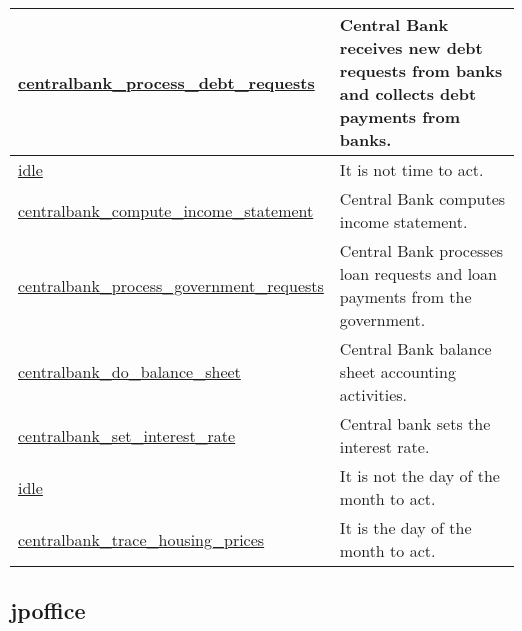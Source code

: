 \documentclass[a4paper,11pt]{article}
\begin{document}
\begin{longtable}[H!]{ll}
\midrule
\parbox{5cm}{\url{centralbank_process_debt_requests}}  & \parbox{10cm}{Central Bank receives new debt requests from banks and collects debt payments from banks.} \\
\midrule
\parbox{5cm}{\url{idle}}  & \parbox{10cm}{It is not time to act.} \\
\midrule
\parbox{5cm}{\url{centralbank_compute_income_statement}}  & \parbox{10cm}{Central Bank computes income statement.} \\
\midrule
\parbox{5cm}{\url{centralbank_process_government_requests}}  & \parbox{10cm}{Central Bank processes loan requests and loan payments from the government.} \\
\midrule
\parbox{5cm}{\url{centralbank_do_balance_sheet}}  & \parbox{10cm}{Central Bank balance sheet accounting activities.} \\
\midrule
\parbox{5cm}{\url{centralbank_set_interest_rate}}  & \parbox{10cm}{Central bank sets the interest rate.} \\
\midrule
\parbox{5cm}{\url{idle}}  & \parbox{10cm}{It is not the day of the month to act.} \\
\midrule
\parbox{5cm}{\url{centralbank_trace_housing_prices}}  & \parbox{10cm}{It is the day of the month to act.} \\
\end{longtable}

\subsection{jpoffice}
\end{document}
